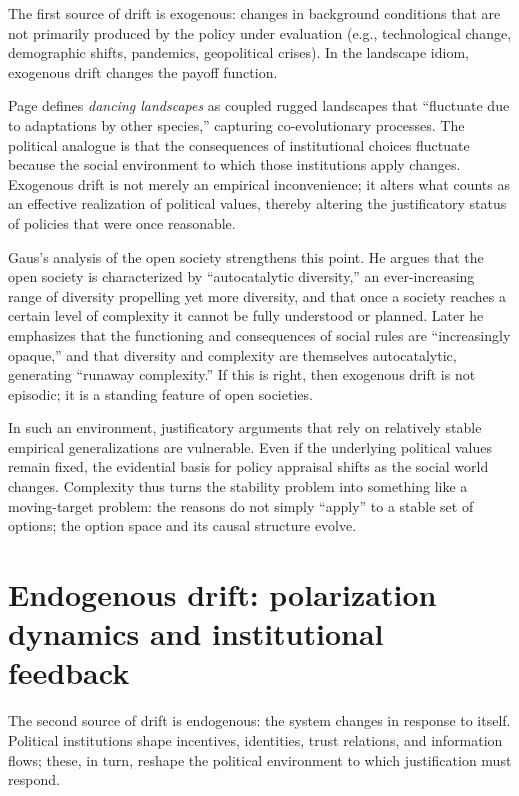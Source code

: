 \documentclass[12pt]{report}
\begin{document}
The first source of drift is exogenous: changes in background conditions that are not primarily produced by the policy under evaluation (e.g., technological change, demographic shifts, pandemics, geopolitical crises). In the landscape idiom, exogenous drift changes the payoff function.

Page defines \emph{dancing landscapes} as coupled rugged landscapes that “fluctuate due to adaptations by other species,” capturing co-evolutionary processes. \parencite[p.~94]{page2011diversity} The political analogue is that the consequences of institutional choices fluctuate because the social environment to which those institutions apply changes. Exogenous drift is not merely an empirical inconvenience; it alters what counts as an effective realization of political values, thereby altering the justificatory status of policies that were once reasonable.

Gaus’s analysis of the open society strengthens this point. He argues that the open society is characterized by “autocatalytic diversity,” an ever-increasing range of diversity propelling yet more diversity, and that once a society reaches a certain level of complexity it cannot be fully understood or planned. \parencite[p.~14]{gaus2021open} Later he emphasizes that the functioning and consequences of social rules are “increasingly opaque,” and that diversity and complexity are themselves autocatalytic, generating “runaway complexity.” \parencite[p.~102]{gaus2021open} If this is right, then exogenous drift is not episodic; it is a standing feature of open societies.

In such an environment, justificatory arguments that rely on relatively stable empirical generalizations are vulnerable. Even if the underlying political values remain fixed, the evidential basis for policy appraisal shifts as the social world changes. Complexity thus turns the stability problem into something like a moving-target problem: the reasons do not simply “apply” to a stable set of options; the option space and its causal structure evolve.

\section{Endogenous drift: polarization dynamics and institutional feedback}

The second source of drift is endogenous: the system changes in response to itself. Political institutions shape incentives, identities, trust relations, and information flows; these, in turn, reshape the political environment to which justification must respond.
\end{document}
